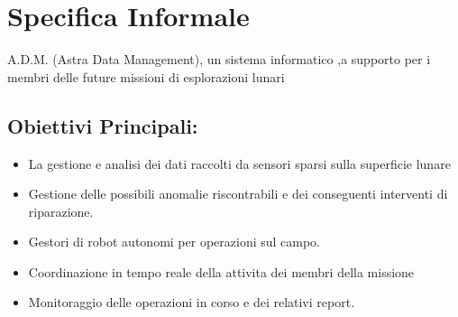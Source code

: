 \section{Specifica Informale} 
A.D.M. (Astra Data Management), un sistema informatico ,a supporto per i membri delle future missioni di esplorazioni lunari

\subsection{Obiettivi Principali:}
\begin{itemize}
\item  La gestione e analisi dei dati raccolti da sensori sparsi sulla superficie lunare 
\item  Gestione delle possibili anomalie riscontrabili e dei conseguenti interventi di riparazione.
\item  Gestori di robot autonomi per operazioni sul campo.
\item  Coordinazione in tempo reale della attivita dei membri della missione
\item  Monitoraggio delle operazioni in corso e dei relativi report.
\end{itemize}
